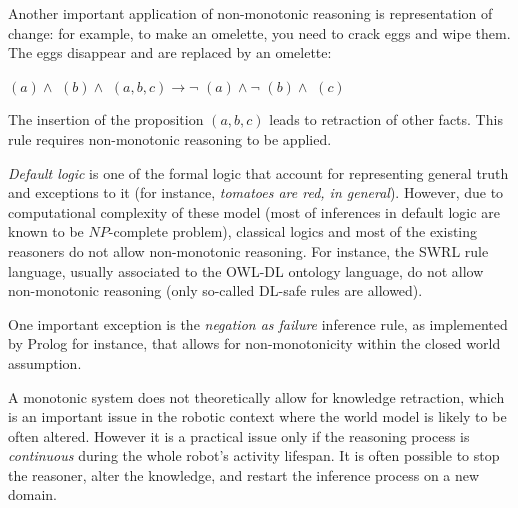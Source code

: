 Another important application of non-monotonic reasoning is representation of
change: for example, to make an omelette, you need to crack eggs and wipe them.
The eggs disappear and are replaced by an omelette:

$(a) \land $  $(b) \land $
$(a, b, c) \to \lnot $ $(a) \land \lnot $
$(b) \land $ $(c)$

The insertion of the proposition $(a, b, c)$ leads to
retraction of other facts. This rule requires non-monotonic reasoning to be
applied.

\emph{Default logic} is one of the formal logic that account for representing
general truth and exceptions to it (for instance, \emph{tomatoes are red, in
general}). However, due to computational complexity of these model (most of
inferences in default logic are known to be $NP$-complete problem), classical
logics and most of the existing reasoners do not allow non-monotonic reasoning.
For instance, the SWRL rule language, usually associated to the OWL-DL ontology
language, do not allow non-monotonic reasoning (only so-called DL-safe rules
are allowed).


One important exception is the \emph{negation as failure} inference rule, as
implemented by {\sc Prolog} for instance, that allows for non-monotonicity
within the closed world assumption.


A monotonic system does not theoretically allow for knowledge retraction,
which is an important issue in the robotic context where the world model is
likely to be often altered.  However it is a practical issue only if the
reasoning process is \emph{continuous} during the whole robot's activity
lifespan. It is often possible to stop the reasoner, alter the knowledge, and
restart the inference process on a new domain.



